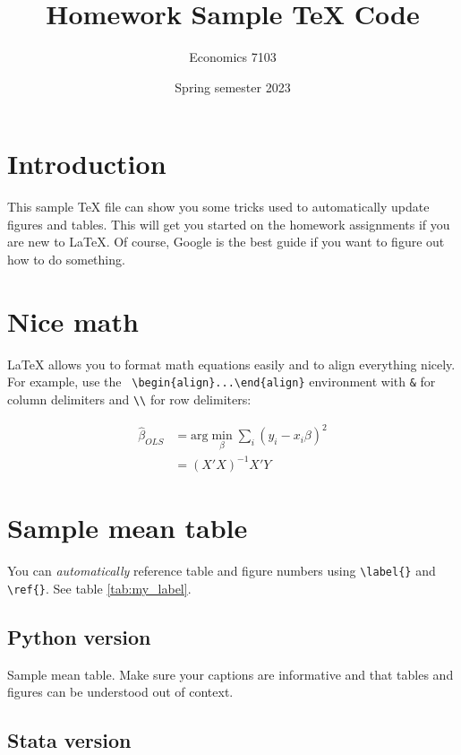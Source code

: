 \documentclass{article}
\title{Homework Sample TeX Code}
\author{Economics 7103}
\date{Spring semester 2023}
\begin{document}
  
\maketitle

\section{Introduction}

This sample TeX file can show you some tricks used to automatically update figures and tables.  This will get you started on the homework assignments if you are new to LaTeX.  Of course, Google is the best guide if you want to figure out how to do something.

\section{Nice math}
LaTeX allows you to format math equations easily and to align everything nicely.  For example, use the \verb! \begin{align}...\end{align}! environment with \verb!&! for column delimiters and \verb!\\! for row delimiters:

\begin{align}
    \hat{\beta}_{OLS} &= \text{arg}\min_{\beta} \sum_{i} (y_i - x_i \beta)^2 \\
    &= (X'X)^{-1}X'Y \label{eq:betahat}
\end{align}

\section{Sample mean table}
You can \textit{automatically} reference table and figure numbers using \verb!\label{}! and \verb!\ref{}!. See table \ref{tab:my_label}.

\subsection{Python version}

\begin{table}[ht]
    \centering
    
    \caption{Sample mean table.  Make sure your captions are informative and that tables and figures can be understood out of context.}
    \label{tab:my_label}
\end{table}

\subsection{Stata version}
\end{document}
